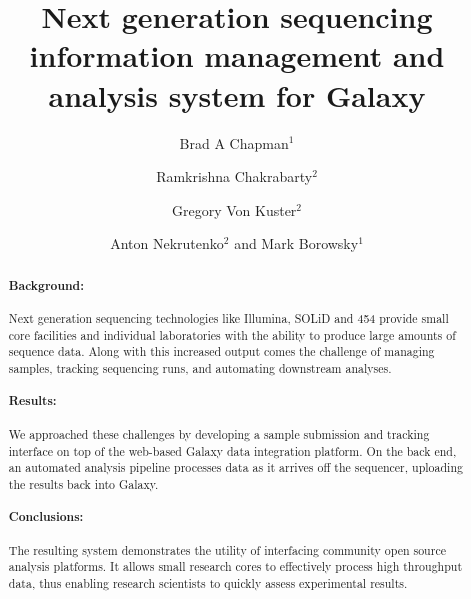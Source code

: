 \documentclass[10pt]{bmc_article}
\newenvironment{bmcformat}{\begin{raggedright}\baselineskip20pt\sloppy\setboolean{publ}{false}}{\end{raggedright}\baselineskip20pt\sloppy}
\begin{document}
\begin{bmcformat}


\title{Next generation sequencing information management and analysis
  system for Galaxy}

\author{Brad A Chapman\correspondingauthor$^{1}$%
      \and
        Ramkrishna Chakrabarty$^2$%
      \and
        Gregory Von Kuster$^2$%
      \and
        Anton Nekrutenko$^2$%
      and
         Mark Borowsky$^1$%
      }

\address{%
    \iid(1)Department of Molecular Biology, Simches Research Center,%
    Massachusetts General Hospital, Boston, MA 02114, USA
    \iid(2)Huck Institute for the Life Sciences,%
    Penn State University, University Park, PA 16803, USA
}%

\maketitle

\begin{abstract}
  \paragraph*{Background:} Next generation sequencing technologies
  like Illumina, SOLiD and 454 provide small core facilities and
  individual laboratories with the ability to produce large amounts of sequence
  data. Along with this increased output comes the challenge of
  managing samples, tracking sequencing runs, and automating downstream
  analyses.
  \paragraph*{Results:} We approached these challenges by developing a
  sample submission and tracking interface on top of the web-based
  Galaxy data integration platform. On the back end, an automated
  analysis pipeline processes data as it arrives off the sequencer,
  uploading the results back into Galaxy.
  \paragraph*{Conclusions:} The resulting system demonstrates the
  utility of interfacing community open source analysis platforms.
  It allows small research cores to effectively process high throughput
  data, thus enabling research scientists to quickly assess experimental
  results.
\end{abstract}


\end{bmcformat}
\end{document}
